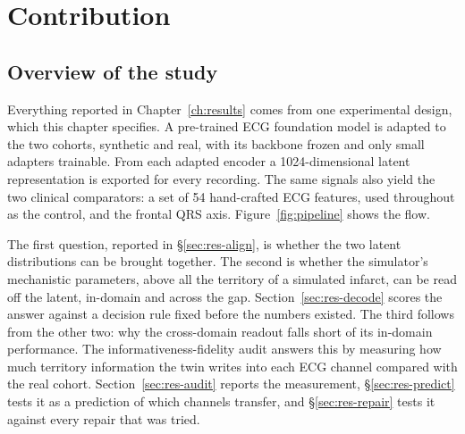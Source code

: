 \chapter{Contribution}
\label{ch:contribution}

\section{Overview of the study}
\label{sec:overview}

Everything reported in Chapter~\ref{ch:results} comes from one experimental design, which this chapter specifies. A pre-trained ECG foundation model is adapted to the two cohorts, synthetic and real, with its backbone frozen and only small adapters trainable. From each adapted encoder a 1024-dimensional latent representation is exported for every recording. The same signals also yield the two clinical comparators: a set of 54 hand-crafted ECG features, used throughout as the control, and the frontal QRS axis. Figure~\ref{fig:pipeline} shows the flow.

The first question, reported in \S\ref{sec:res-align}, is whether the two latent distributions can be brought together. The second is whether the simulator's mechanistic parameters, above all the territory of a simulated infarct, can be read off the latent, in-domain and across the gap. Section~\ref{sec:res-decode} scores the answer against a decision rule fixed before the numbers existed. The third follows from the other two: why the cross-domain readout falls short of its in-domain performance. The informativeness-fidelity audit answers this by measuring how much territory information the twin writes into each ECG channel compared with the real cohort. Section~\ref{sec:res-audit} reports the measurement, \S\ref{sec:res-predict} tests it as a prediction of which channels transfer, and \S\ref{sec:res-repair} tests it against every repair that was tried.


